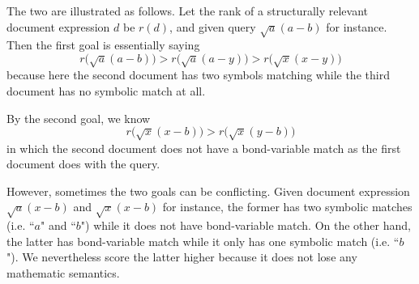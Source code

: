\documentclass{acm_proc_article-sp}
\begin{document}
The two are illustrated as follows. 
Let the rank of a structurally relevant document expression $d$ be $r(d)$, and given query $\sqrt a (a - b)$ for instance. 
Then the first goal is essentially saying 
$$
r\big(\sqrt a (a - b)\big) > r\big(\sqrt a (a - y)\big) > r\big(\sqrt x (x - y)\big)
$$
because here the second document has two symbols matching while the third document has no symbolic match at all. 

By the second goal, we know
$$
r\big(\sqrt x (x - b)\big) > r\big(\sqrt x (y - b)\big)
$$
in which the second document does not have a bond-variable match as the first document does with the query.

However, sometimes the two goals can be conflicting.
Given document expression $\sqrt a (x - b)$ and $\sqrt x (x - b)$ for instance, the former has two symbolic matches (i.e. ``$a$" and ``$b$") while it does not have bond-variable match. On the other hand, the latter has bond-variable match while it only has one symbolic match (i.e. ``$b$"). 
We nevertheless score the latter higher because it does not lose any mathematic semantics. 
\end{document}
